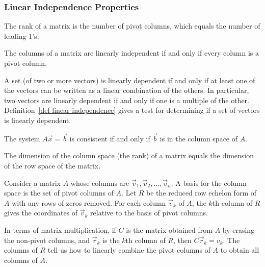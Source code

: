 \subsubsection{Linear Independence Properties}

\begin{theorem}\label{thm rank equal pivot columns}
The rank of a matrix is the number of pivot columns, which equals the number of leading 1's. 
\end{theorem}

\begin{theorem}\label{every column pivot iff independent}
The columns of a matrix are linearly independent if and only if every column is a pivot column.
\end{theorem}

\begin{theorem}\label{dependentiff}
  A set (of two or more vectors) is linearly dependent if and only if at least one of the vectors can be written as a linear combination of the others. In particular, two vectors are linearly dependent if and only if one is a multiple of the other.  Definition~\ref{def linear independence} gives a test for determining if a set of vectors is linearly dependent.
\end{theorem}


\begin{theorem}
The system $A\vec x=\vec b$ is consistent if and only if $\vec b$ is in the column space of $A$. 
\end{theorem}


\begin{theorem}\label{rankrowcolumn}
The dimension of the column space (the rank) of a matrix equals the dimension of the row space of the matrix.
\end{theorem}


\begin{theorem}\label{thm colsp basis}
Consider a matrix $A$ whose columns are $\vec v_1,\vec v_2,\ldots,\vec v_n$. A basis for the column space is the set of pivot columns of $A$.  Let $R$ be the reduced row echelon form of $A$ with any rows of zeros removed. For each column $\vec v_k$ of $A$, the $k$th column of $R$ gives the coordinates of $\vec v_k$ relative to the basis of pivot columns.
  
In terms of matrix multiplication, if $C$ is the matrix obtained from $A$ by erasing the non-pivot columns, and $\vec r_k$ is the $k$th column of $R$, then $C\vec r_k=v_k$. The columns of $R$ tell us how to linearly combine the pivot columns of $A$ to obtain all columns of $A$.
\end{theorem}

